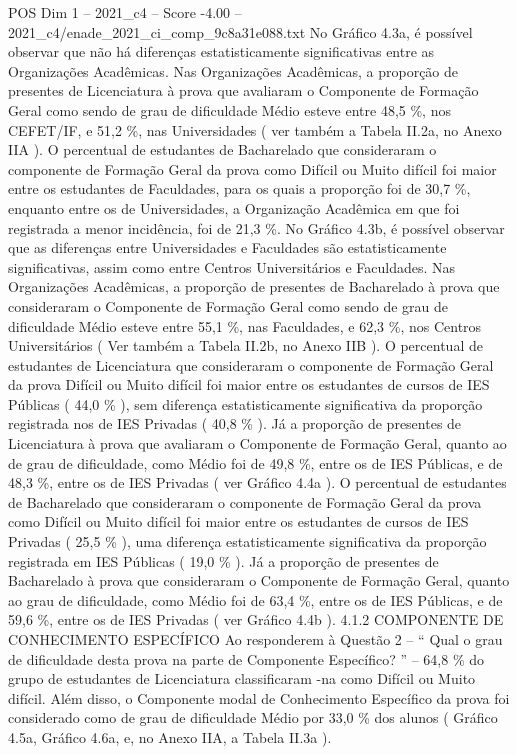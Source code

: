 \begin{textsample}{POS Dim 1 – 2021\_c4 – Score -4.00 – 2021\_c4/enade\_2021\_ci\_comp\_9c8a31e088.txt}
No Gráfico 4.3a, é possível observar que não há diferenças estatisticamente significativas entre as Organizações Acadêmicas.
Nas Organizações Acadêmicas, a proporção de presentes de Licenciatura à prova que avaliaram o Componente de Formação Geral como sendo de grau de dificuldade Médio esteve entre 48,5 \%, nos CEFET/IF, e 51,2 \%, nas Universidades ( ver também a Tabela II.2a, no Anexo IIA ).
O percentual de estudantes de Bacharelado que consideraram o componente de Formação Geral da prova como Difícil ou Muito difícil foi maior entre os estudantes de Faculdades, para os quais a proporção foi de 30,7 \%, enquanto entre os de Universidades, a Organização Acadêmica em que foi registrada a menor incidência, foi de 21,3 \%.
No Gráfico 4.3b, é possível observar que as diferenças entre Universidades e Faculdades são estatisticamente significativas, assim como entre Centros Universitários e Faculdades.
Nas Organizações Acadêmicas, a proporção de presentes de Bacharelado à prova que consideraram o Componente de Formação Geral como sendo de grau de dificuldade Médio esteve entre 55,1 \%, nas Faculdades, e 62,3 \%, nos Centros Universitários ( Ver também a Tabela II.2b, no Anexo IIB ).
O percentual de estudantes de Licenciatura que consideraram o componente de Formação Geral da prova Difícil ou Muito difícil foi maior entre os estudantes de cursos de IES Públicas ( 44,0 \% ), sem diferença estatisticamente significativa da proporção registrada nos de IES Privadas ( 40,8 \% ).
Já a proporção de presentes de Licenciatura à prova que avaliaram o Componente de Formação Geral, quanto ao de grau de dificuldade, como Médio foi de 49,8 \%, entre os de IES Públicas, e de 48,3 \%, entre os de IES Privadas ( ver Gráfico 4.4a ).
O percentual de estudantes de Bacharelado que consideraram o componente de Formação Geral da prova como Difícil ou Muito difícil foi maior entre os estudantes de cursos de IES Privadas ( 25,5 \% ), uma diferença estatisticamente significativa da proporção registrada em IES Públicas ( 19,0 \% ).
Já a proporção de presentes de Bacharelado à prova que consideraram o Componente de Formação Geral, quanto ao grau de dificuldade, como Médio foi de 63,4 \%, entre os de IES Públicas, e de 59,6 \%, entre os de IES Privadas ( ver Gráfico 4.4b ). 4.1.2 COMPONENTE DE CONHECIMENTO ESPECÍFICO Ao responderem à Questão 2 – “ Qual o grau de dificuldade desta prova na parte de Componente Específico? ” – 64,8 \% do grupo de estudantes de Licenciatura classificaram -na como Difícil ou Muito difícil.
Além disso, o Componente modal de Conhecimento Específico da prova foi considerado como de grau de dificuldade Médio por 33,0 \% dos alunos ( Gráfico 4.5a, Gráfico 4.6a, e, no Anexo IIA, a Tabela II.3a ).

\end{textsample}
